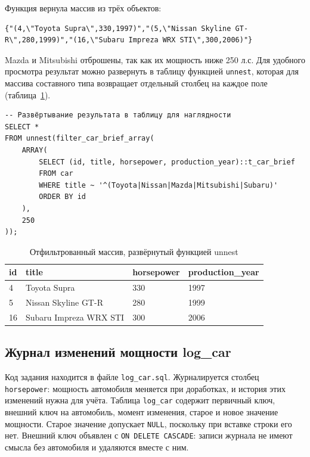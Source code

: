 \documentclass[oneside,a4paper,14pt]{extarticle}
\begin{document}
Функция вернула массив из трёх объектов:

\begin{Verbatim}[fontsize=\footnotesize,breaklines=true]
{"(4,\"Toyota Supra\",330,1997)","(5,\"Nissan Skyline GT-R\",280,1999)","(16,\"Subaru Impreza WRX STI\",300,2006)"}
\end{Verbatim}

Mazda и Mitsubishi отброшены, так как их мощность ниже 250 л.с. Для удобного просмотра результат можно развернуть в таблицу функцией \texttt{unnest}, которая для массива составного типа возвращает отдельный столбец на каждое поле (таблица~\ref{tab:unnest}).

\begin{verbatim}
-- Развёртывание результата в таблицу для наглядности
SELECT *
FROM unnest(filter_car_brief_array(
    ARRAY(
        SELECT (id, title, horsepower, production_year)::t_car_brief
        FROM car
        WHERE title ~ '^(Toyota|Nissan|Mazda|Mitsubishi|Subaru)'
        ORDER BY id
    ),
    250
));
\end{verbatim}

\begin{table}[H]
\centering
\footnotesize
\caption{Отфильтрованный массив, развёрнутый функцией unnest}\label{tab:unnest}
\begin{tabular}{|l|l|l|l|}
\hline
\textbf{id} & \textbf{title} & \textbf{horsepower} & \textbf{production\_\allowbreak year} \\ \hline
4 & Toyota Supra & 330 & 1997 \\ \hline
5 & Nissan Skyline GT-R & 280 & 1999 \\ \hline
16 & Subaru Impreza WRX STI & 300 & 2006 \\ \hline
\end{tabular}
\end{table}

\subsection{Журнал изменений мощности log\_car}

Код задания находится в файле \texttt{log\_car.sql}. Журналируется столбец \texttt{horsepower}: мощность автомобиля меняется при доработках, и история этих изменений нужна для учёта. Таблица \texttt{log\_car} содержит первичный ключ, внешний ключ на автомобиль, момент изменения, старое и новое значение мощности. Старое значение допускает \texttt{NULL}, поскольку при вставке строки его нет. Внешний ключ объявлен с \texttt{ON DELETE CASCADE}: записи журнала не имеют смысла без автомобиля и удаляются вместе с ним.
\end{document}
